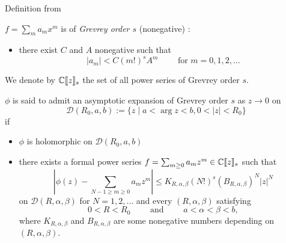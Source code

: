 {  \begin{frame}[t]{Definition from \cite{zbMATH00060600}}
  \begin{defn}
    $f=\sum_ma_mx^m$ is of \emph{Grevrey order $s$} (nonegative)
    :\Leftrightarrow
    \begin{itemize}
      \item there exist $C$ and $A$ nonegative such that
      \[
        |a_m|< C(m!)^sA^m \qquad \text{ for } m=0,1,2,\dots
      \]
    \end{itemize}
    We denote by $\mathbb{C}\llbracket z\rrbracket_s$ the set of all power series of
    Grevrey order $s$.
  \end{defn}
  \begin{defn}
  $\phi$ is said to admit an asymptotic expansion of Grevrey order $s$ as
  $z\to0$ on
  \[
    \mathcal{D}(R_0,a,b):=\{z \mid a < \arg z < b , 0 < |z| < R_0\}
  \]
  if
  \begin{itemize}
    \item $\phi$ is holomorphic on $\mathcal{D}(R_0,a,b)$
    \item there exists a formal power series
    $f=\sum_{m\geq0}a_mz^m \in \mathbb{C}\llbracket z\rrbracket_s$ such that
    \[
      \left|\phi(z)-\sum_{N-1\geq m\geq 0}a_mz^m\right|
      \leq K_{R,\alpha,\beta}(N!)^s(B_{R,\alpha,\beta})^N|z|^N
    \]
    on $\mathcal{D}(R,\alpha,\beta)$ for $N=1,2,\dots$ and every
    $(R,\alpha,\beta)$ satisfying
    \[
      0 < R < R_0 \qquad \text{ and } \qquad a < \alpha < \beta < b,
    \]
    where $K_{R,\alpha,\beta}$ and $B_{R,\alpha,\beta}$ are some nonegative
    numbers depending on $(R,\alpha,\beta)$.
  \end{itemize}
  \end{defn}
  \end{frame}

}
